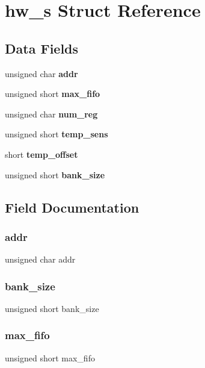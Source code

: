 \section{hw\+\_\+s Struct Reference}
\label{structhw__s}
\subsection*{Data Fields}
\begin{DoxyCompactItemize}
\item 
unsigned char \textbf{ addr}
\item 
unsigned short \textbf{ max\+\_\+fifo}
\item 
unsigned char \textbf{ num\+\_\+reg}
\item 
unsigned short \textbf{ temp\+\_\+sens}
\item 
short \textbf{ temp\+\_\+offset}
\item 
unsigned short \textbf{ bank\+\_\+size}
\end{DoxyCompactItemize}


\subsection{Field Documentation}
\mbox{\label{structhw__s_a4c34a946600e9d68b6355d23f54d291b}} 
\subsubsection{addr}
{\footnotesize\ttfamily unsigned char addr}

\mbox{\label{structhw__s_a9e26f1784621a59cabcbfff28dc0b8ba}} 
\subsubsection{bank\+\_\+size}
{\footnotesize\ttfamily unsigned short bank\+\_\+size}

\mbox{\label{structhw__s_a36e9e2aea952cea137504c539cdb97dc}} 
\subsubsection{max\+\_\+fifo}
{\footnotesize\ttfamily unsigned short max\+\_\+fifo}

